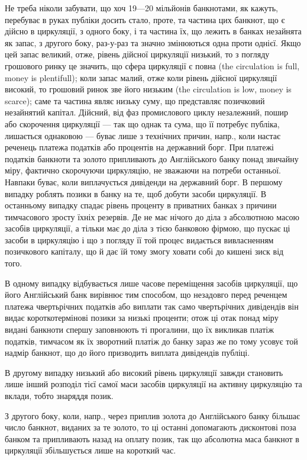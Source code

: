 Не треба ніколи забувати, що хоч 19—20 мільйонів банкнотами, як
кажуть, перебуває в руках публіки досить стало, проте, та частина цих банкнот,
що є дійсно в циркуляції, з одного боку, і та частина їх, що лежить в банках
незайнята як запас, з другого боку, раз-у-раз та значно змінюються одна
проти однієї. Якщо цей запас великий, отже, рівень дійсної циркуляції низький,
то з погляду грошового ринку це значить, що сфера циркуляції є повна (the
circulation is full, money is plentifull); коли запас малий, отже коли рівень
дійсної циркуляції високий, то грошовий ринок зве його низьким (the circulation
is low, money is scarce); саме та частина являє низьку суму, що представляє
позичковий незайнятий капітал. Дійсний, від фаз промислового циклу незалежний,
пошир або скорочення циркуляції — так що однак та сума, що її потребує
публіка, лишається однаковою — буває лише з технічних причин, напр., коли настає
реченець платежа податків або процентів на державний борг. При платежі податків
банкноти та золото припливають до Англійського банку понад звичайну міру,
фактично скорочуючи циркуляцію, не зважаючи на потреби останньої. Навпаки
буває, коли виплачується дивіденди на державний борг. В першому випадку
роблять позики в банку на те, щоб добути засоби циркуляції. В останньому
випадку спадає рівень проценту в приватних банках з причини тимчасового
зросту їхніх резервів. Де не має нічого до діла з абсолютною масою засобів
циркуляції, а тільки має до діла з тією банковою фірмою, що пускає ці засоби
в циркуляцію і що з погляду її той процес видається вивласненням
позичкового капіталу, що й дає їй тому змогу ховати собі до кишені зиск
від того.

В одному випадку відбувається лише часове переміщення засобів циркуляції,
що його Англійський банк вирівнює тим способом, що незадовго перед реченцем
платежа чвертьрічних податків або виплати так само чвертьрічних дивідендів
він видає короткотермінові позики за низькі проценти; отож ці отак понад міру
видані банкноти спершу заповнюють ті прогалини, що їх викликав платіж
податків, тимчасом як їх зворотний платіж до банку зараз же по тому усовує
той надмір банкнот, що до його призводить виплата дивідендів публіці.

В другому випадку низький або високий рівень циркуляції завжди становить
лише інший розподіл тієї самої маси засобів циркуляції на активну циркуляцію
та вклади, тобто знаряддя позик.

З другого боку, коли, напр., через приплив золота до Англійського банку
більшає число банкнот, виданих за те золото, то ці останні допомагають
дисконтові поза банком та припливають назад на оплату позик, так що абсолютна
маса банкнот в циркуляції збільшується лише на короткий час.

